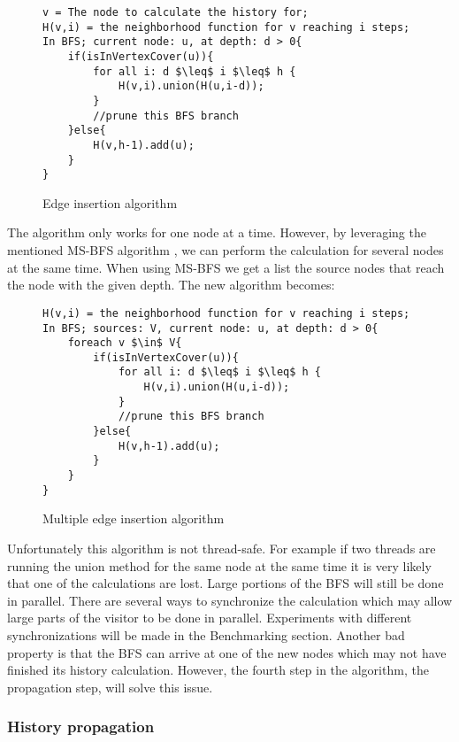 \begin{figure}[h]
    \begin{lstlisting}[mathescape]
v = The node to calculate the history for;
H(v,i) = the neighborhood function for v reaching i steps;
In BFS; current node: u, at depth: d > 0{
    if(isInVertexCover(u)){
        for all i: d $\leq$ i $\leq$ h {
            H(v,i).union(H(u,i-d));
        }
        //prune this BFS branch
    }else{
        H(v,h-1).add(u);
    }
}
    \end{lstlisting}
    \caption{Edge insertion algorithm}
    \label{fig:edge_insertion_algorithm}
\end{figure}

The algorithm only works for one node at a time. However, by leveraging the mentioned MS-BFS algorithm \cite{msbfs}, we can perform the calculation for several nodes at the same time. When using MS-BFS we get a list the source nodes that reach the node with the given depth. The new algorithm becomes:

\begin{figure}[h]
    \begin{lstlisting}[mathescape]
H(v,i) = the neighborhood function for v reaching i steps;
In BFS; sources: V, current node: u, at depth: d > 0{
    foreach v $\in$ V{
        if(isInVertexCover(u)){
            for all i: d $\leq$ i $\leq$ h {
                H(v,i).union(H(u,i-d));
            }
            //prune this BFS branch
        }else{
            H(v,h-1).add(u);
        }
    }
}
    \end{lstlisting}
    \caption{Multiple edge insertion algorithm}
    \label{fig:multiple_edge_insertion_algorithm}
\end{figure}

Unfortunately this algorithm is not thread-safe. For example if two threads are running the union method for the same node at the same time it is very likely that one of the calculations are lost. Large portions of the BFS will still be done in parallel. There are several ways to synchronize the calculation which may allow large parts of the visitor to be done in parallel. Experiments with different synchronizations will be made in the Benchmarking section. Another bad property is that the BFS can arrive at one of the new nodes which may not have finished its history calculation. However, the fourth step in the algorithm, the propagation step, will solve this issue. 

\subsubsection{History propagation}

